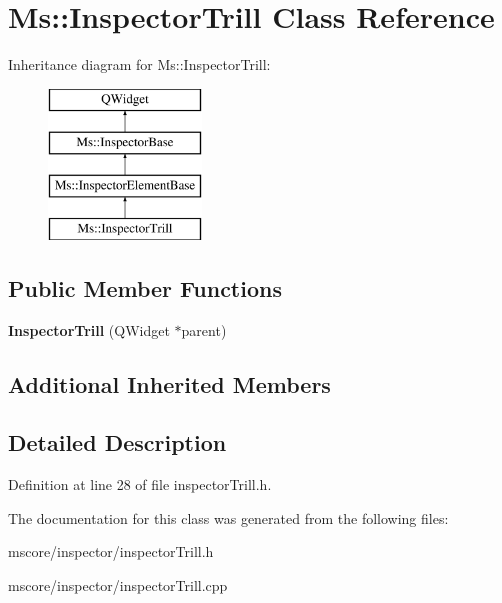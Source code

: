 \hypertarget{class_ms_1_1_inspector_trill}{}\section{Ms\+:\+:Inspector\+Trill Class Reference}
\label{class_ms_1_1_inspector_trill}
Inheritance diagram for Ms\+:\+:Inspector\+Trill\+:\begin{figure}[H]
\begin{center}
\leavevmode
\includegraphics[height=4.000000cm]{class_ms_1_1_inspector_trill}
\end{center}
\end{figure}
\subsection*{Public Member Functions}
\begin{DoxyCompactItemize}
\item 
\mbox{\label{class_ms_1_1_inspector_trill_ac506fc2f068c4c05e54915c5668a05d2}} 
{\bfseries Inspector\+Trill} (Q\+Widget $\ast$parent)
\end{DoxyCompactItemize}
\subsection*{Additional Inherited Members}


\subsection{Detailed Description}


Definition at line 28 of file inspector\+Trill.\+h.



The documentation for this class was generated from the following files\+:\begin{DoxyCompactItemize}
\item 
mscore/inspector/inspector\+Trill.\+h\item 
mscore/inspector/inspector\+Trill.\+cpp\end{DoxyCompactItemize}

